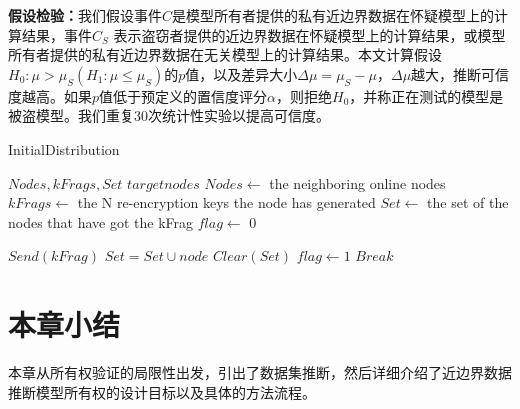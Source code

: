 \noindent\textbf{假设检验：}我们假设事件$C$是模型所有者提供的私有近边界数据在怀疑模型上的计算结果，事件$C_S$ 表示盗窃者提供的近边界数据在怀疑模型上的计算结果，或模型所有者提供的私有近边界数据在无关模型上的计算结果。本文计算假设$H_0:\mu > \mu_S(H_1:\mu\leq\mu_S)$的$p$值，以及差异大小$\Delta \mu = \mu_S - \mu$，$\Delta\mu$越大，推断可信度越高。如果$p$值低于预定义的置信度评分$\alpha$，则拒绝$H_0$，并称正在测试的模型是被盗模型。我们重复30次统计性实验以提高可信度。


\begin{algorithm}[H]
	\caption{InitialDistribution}
	\label{alg:3}
	\begin{algorithmic}[1]
		
		\Require $Nodes,kFrags,Set$
		\Ensure $targetnodes$
		\State $Nodes \gets$ the neighboring online nodes
		\State $kFrags \gets$ the N re-encryption keys the node has generated
		\State $Set \gets$ the set of the nodes that have got the kFrag
		\State $flag \gets$ 0
		\State
		\State {}
		\EndIf
		\State {}
		\EndIf
		\EndFor
		
		
		\State    
		\State $Send(kFrag)$
		\State $Set=Set \cup node$
		\State $Clear(Set)$
		\EndIf
		\State $flag \gets 1$
		\State $Break$
		
		
		\EndIf
		\EndFor
		\EndFunction
		
		
	\end{algorithmic}
\end{algorithm}

\section{本章小结}

本章从所有权验证的局限性出发，引出了数据集推断，然后详细介绍了近边界数据推断模型所有权的设计目标以及具体的方法流程。

